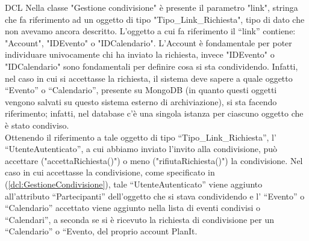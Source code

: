\begin{listaPersonale}{DCL}
    Nella classe "Gestione condivisione" è presente il parametro "link", stringa che fa riferimento ad un oggetto di tipo "Tipo\_Link\_Richiesta", tipo di dato che non avevamo ancora descritto.
    L’oggetto a cui fa riferimento il “link” contiene: "Account", "IDEvento" o "IDCalendario". L’Account è fondamentale per poter individuare univocamente chi ha inviato la richiesta, invece "IDEvento" o "IDCalendario" sono fondamentali per definire cosa si sta condividendo. Infatti, nel caso in cui si accettasse la richiesta, il sistema deve sapere a quale oggetto “Evento” o “Calendario”, presente su MongoDB (in quanto questi oggetti vengono salvati su questo sistema esterno di archiviazione), si sta facendo riferimento; infatti, nel database c’è una singola istanza per ciascuno oggetto che è stato condiviso.\\
    Ottenendo il riferimento a tale oggetto di tipo “Tipo\_Link\_Richiesta”, l’ “UtenteAutenticato”, a cui abbiamo inviato l’invito alla condivisione, può accettare ("accettaRichiesta()") o meno ("rifiutaRichiesta()") la condivisione. Nel caso in cui accettasse la condivisione, come specificato in (\ref{dcl:GestioneCondivisione}), tale “UtenteAutenticato” viene aggiunto all’attributo “Partecipanti” dell’oggetto che si stava condividendo e l’ “Evento” o “Calendario” accettato viene aggiunto nella lista di eventi condivisi o “Calendari”, a seconda se si è ricevuto la richiesta di condivisione per un “Calendario” o “Evento, del proprio account PlanIt.



\end{listaPersonale}
